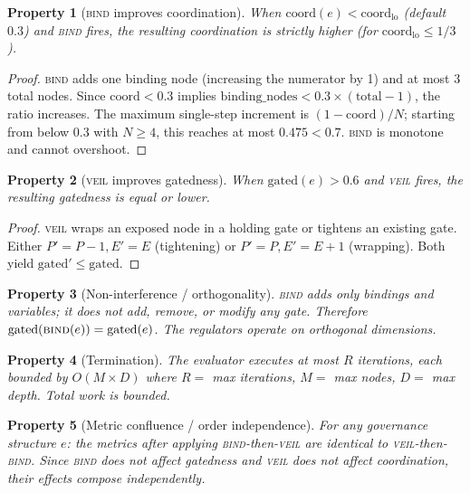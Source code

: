 \documentclass[sigconf,nonacm]{acmart}
\newtheorem{property}{Property}
\begin{document}
\begin{property}[\textsc{bind} improves coordination]\label{prop:bind}
When $\mathrm{coord}(e) < \mathrm{coord}_{\mathrm{lo}}$ (default $0.3$) and \textsc{bind} fires, the resulting
coordination is strictly higher (for $\mathrm{coord}_{\mathrm{lo}} \leq 1/3$).
\end{property}
\begin{proof}
\textsc{bind} adds one binding node (increasing the numerator by 1) and
at most 3 total nodes. Since $\mathrm{coord} < 0.3$ implies
$\mathrm{binding\_nodes} < 0.3 \times (\mathrm{total} - 1)$, the ratio
increases. The maximum single-step increment is $(1 - \mathrm{coord})/N$;
starting from below 0.3 with $N \geq 4$, this reaches at most
$0.475 < 0.7$. \textsc{bind} is monotone and cannot overshoot.
\end{proof}

\begin{property}[\textsc{veil} improves gatedness]\label{prop:veil}
When $\mathrm{gated}(e) > 0.6$ and \textsc{veil} fires, the resulting
gatedness is equal or lower.
\end{property}
\begin{proof}
\textsc{veil} wraps an exposed node in a holding gate or tightens an
existing gate. Either $P' = P - 1, E' = E$ (tightening) or
$P' = P, E' = E + 1$ (wrapping). Both yield
$\mathrm{gated}' \leq \mathrm{gated}$.
\end{proof}

\begin{property}[Non-interference / orthogonality]\label{prop:ortho}
\textsc{bind} adds only bindings and variables; it does not add, remove,
or modify any gate. Therefore $\mathrm{gated}(\textsc{bind}(e)) =
\mathrm{gated}(e)$. The regulators operate on orthogonal dimensions.
\end{property}

\begin{property}[Termination]\label{prop:term}
The evaluator executes at most $R$ iterations, each bounded by
$O(M \times D)$ where $R =$ max iterations, $M =$ max nodes,
$D =$ max depth. Total work is bounded.
\end{property}

\begin{property}[Metric confluence / order independence]\label{prop:confluence}
For any governance structure $e$: the metrics after applying
\textsc{bind}-then-\textsc{veil} are identical to
\textsc{veil}-then-\textsc{bind}. Since \textsc{bind} does not affect
gatedness and \textsc{veil} does not affect coordination, their effects
compose independently.
\end{property}
\end{document}
